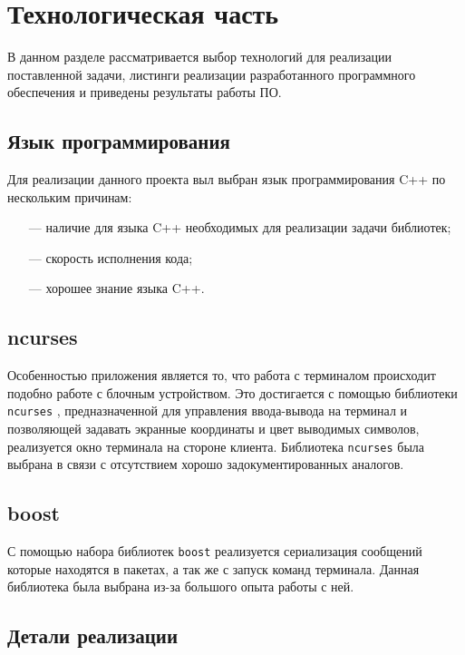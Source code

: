 \chapter{Технологическая часть}

В данном разделе рассматривается выбор технологий для реализации поставленной задачи, листинги реализации разработанного программного обеспечения и приведены результаты работы ПО.

\section{Язык программирования}

Для реализации данного проекта выл выбран язык программирования C++ \cite{c++} по нескольким причинам:

\begin{itemize}
	\item[---] наличие для языка C++ необходимых для реализации задачи библиотек;
	\item[---] скорость исполнения кода;
	\item[---] хорошее знание языка C++.
\end{itemize}

\section{ncurses}

Особенностью приложения является то, что работа с терминалом происходит подобно работе с блочным устройством. Это достигается с помощью библиотеки \texttt{ncurses} \cite{ncurses}, предназначенной для управления ввода-вывода на терминал и позволяющей задавать экранные координаты и цвет выводимых символов, реализуется окно терминала на стороне клиента. Библиотека \texttt{ncurses} была выбрана в связи с отсутствием хорошо задокументированных аналогов.

\section{boost}

С помощью набора библиотек \texttt{boost} \cite{boost} реализуется сериализация сообщений которые находятся в пакетах, а так же с запуск команд терминала. Данная библиотека была выбрана из-за большого опыта работы с ней.

\section{Детали реализации}

